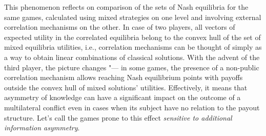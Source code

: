 This phenomenon reflects on comparison of the sets of Nash equilibria for the same games, calculated using mixed strategies on one level and involving external correlation mechanisms on the other. In case of two players, all vectors of expected utility in the correlated equilibria belong to the convex hull of the set of mixed equilibria utilities, i.e., correlation mechanisms can be thought of simply as a way to obtain linear combinations of classical solutions. With the advent of the third player, the picture changes "--- in some games, the presence of a non-public correlation mechanism allows reaching Nash equilibrium points with payoffs outside the convex hull of mixed solutions' utilities. Effectively, it means that asymmetry of knowledge can have a significant impact on the outcome of a multilateral conflict even in cases when its subject have no relation to the payout structure. Let's call the games prone to this effect \emph{sensitive to additional information asymmetry}. %

